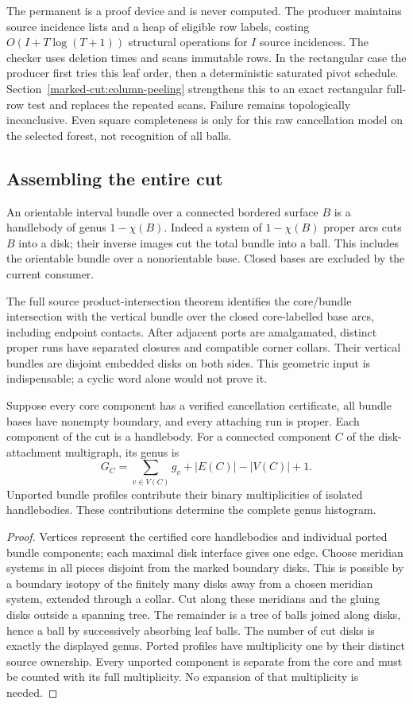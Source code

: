 The permanent is a proof device and is never computed. The producer maintains
source incidence lists and a heap of eligible row labels, costing
$O(I+T\log(T+1))$ structural operations for $I$ source incidences. The checker
uses deletion times and scans immutable rows. In the rectangular case the
producer first tries this leaf order, then a deterministic saturated pivot
schedule. Section~\ref{marked-cut:column-peeling} strengthens this to an exact
rectangular full-row test and replaces the repeated scans. Failure remains
topologically inconclusive. Even square completeness is only for this
raw cancellation model on the selected forest, not recognition of all balls.

\subsection{Assembling the entire cut}

An orientable interval bundle over a connected bordered surface $B$ is a
handlebody of genus $1-\chi(B)$. Indeed a system of $1-\chi(B)$ proper arcs
cuts $B$ into a disk; their inverse images cut the total bundle into a ball.
This includes the orientable bundle over a nonorientable base. Closed bases
are excluded by the current consumer.

The full source product-intersection theorem identifies the core/bundle
intersection with the vertical bundle over the closed core-labelled base
arcs, including endpoint contacts. After adjacent ports are amalgamated,
distinct proper runs have separated closures and compatible corner collars.
Their vertical bundles are disjoint embedded disks on both sides. This
geometric input is indispensable; a cyclic word alone would not prove it.

\begin{proposition}
\label{marked-cut:census}
Suppose every core component has a verified cancellation certificate, all
bundle bases have nonempty boundary, and every attaching run is proper.
Each component of the cut is a handlebody. For a connected component $C$ of
the disk-attachment multigraph, its genus is
\[
 G_C=\sum_{v\in V(C)}g_v+|E(C)|-|V(C)|+1.
\]
Unported bundle profiles contribute their binary multiplicities of isolated
handlebodies. These contributions determine the complete genus histogram.
\end{proposition}
\begin{proof}
Vertices represent the certified core handlebodies and individual ported
bundle components; each maximal disk interface gives one edge. Choose
meridian systems in all pieces disjoint from the marked boundary disks.
This is possible by a boundary isotopy of the finitely many disks away
from a chosen meridian system, extended through a collar. Cut along these
meridians and the gluing disks outside a spanning tree. The remainder is a
tree of balls joined along disks, hence a ball by successively absorbing
leaf balls. The number of cut disks is exactly the displayed genus.
Ported profiles have multiplicity one by their distinct source ownership.
Every unported component is separate from the core and must be counted
with its full multiplicity. No expansion of that multiplicity is needed.
\end{proof}

